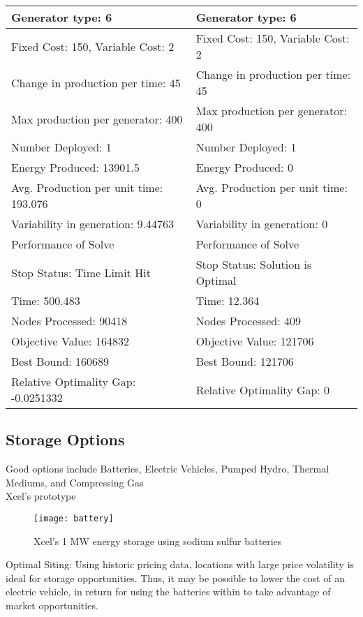\begin{longtable}{ |  l  |  l  | }
\hline
Generator type: 6			&	Generator type: 6	\\
\hline
Fixed Cost: 150, Variable Cost: 2	&	Fixed Cost: 150, Variable Cost: 2	\\
Change in production per time: 45	&	Change in production per time: 45	\\
Max production per generator: 400	&	Max production per generator: 400	\\
Number Deployed: 1			&	Number Deployed: 1	\\
Energy Produced: 13901.5		&	Energy Produced: 0	\\
Avg. Production per unit time: 193.076&	Avg. Production per unit time: 0	\\
Variability in generation: 9.44763	&	Variability in generation: 0	\\


\hline
Performance of Solve			&	Performance of Solve	\\
\hline
Stop Status: Time Limit Hit		&	Stop Status: Solution is Optimal	\\
Time: 500.483				&	Time: 12.364		\\
Nodes Processed: 90418		&	Nodes Processed: 409		\\
Objective Value: 164832		&	Objective Value: 121706		\\
Best Bound: 160689			&	Best Bound: 121706		\\
Relative Optimality Gap: -0.0251332	&	Relative Optimality Gap: 0	\\
\hline
\end{longtable}


\subsection{Storage Options}
	Good options include Batteries, Electric Vehicles, Pumped Hydro, Thermal Mediums, and Compressing Gas  \\
Xcel's prototype
\begin{figure}[h]
\centering
\texttt{[image: battery]}
\caption{Xcel's 1 MW energy storage using sodium sulfur batteries}
\end{figure}

Optimal Siting:	Using historic pricing data, locations with large price volatility is ideal for storage opportunities.  Thus, it may be possible to lower the cost of an electric vehicle, in return for using the batteries within to take advantage of market opportunities.
 